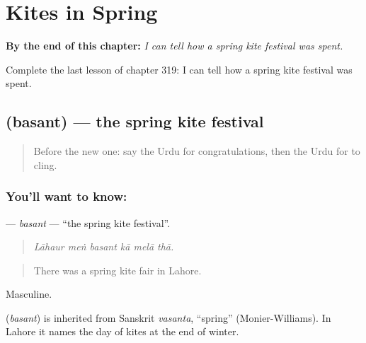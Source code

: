 
\chapter{Kites in Spring}
\label{ch:ur-kites-in-spring}

\begin{chapteropening}
\textbf{By the end of this chapter:} \emph{I can tell how a spring kite festival was spent.}

Complete the last lesson of chapter 319: I can tell how a spring kite festival was spent.
\end{chapteropening}

\section[\texorpdfstring{\ur{بسنت} (basant)}{بسنت (basant)}]{ (basant) — the spring kite festival}

\label{lesson:UR-C319-basant}



\begin{quote}
Before the new one: say the Urdu for congratulations, then the Urdu for to cling.
\end{quote}

\subsection*{You'll want to know: }
\textbf{} — \emph{basant} — \textquotedblleft{}the spring kite festival\textquotedblright{}.

\begin{quote}
     
\end{quote}

\begin{quote}
\emph{Lāhaur meṅ basant kā melā thā.}
\end{quote}

\begin{quote}
There was a spring kite fair in Lahore.
\end{quote}

Masculine.

\begin{cousinweb}
\textbf{} (\emph{basant}) is inherited from Sanskrit \emph{vasanta}, \textquotedblleft{}spring\textquotedblright{} (Monier-Williams). In Lahore it names the day of kites at the end of winter.
\end{cousinweb}

